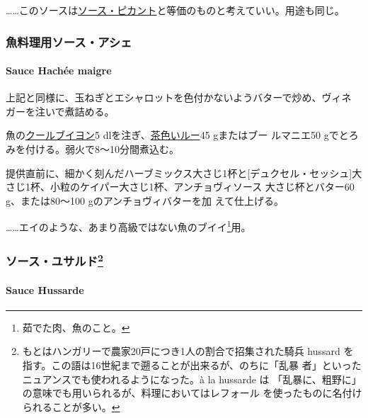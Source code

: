 \begin{recette}
\ldots{}\ldots{}このソースは\protect\hyperlink{ux30bdux30fcux30b9ux30d4ux30abux30f3ux30c8}{ソース・ピカント}と等価のものと考えていい。用途も同じ。

\maeaki

\hypertarget{ux9b5aux6599ux7406ux7528ux30bdux30fcux30b9ux30a2ux30b7ux30a7}{%
\subsubsection{魚料理用ソース・アシェ}\label{ux9b5aux6599ux7406ux7528ux30bdux30fcux30b9ux30a2ux30b7ux30a7}}

\hypertarget{sauce-hachee-maigre}{%
\paragraph{Sauce Hachée maigre}\label{sauce-hachee-maigre}}

上記と同様に、玉ねぎとエシャロットを色付かないようバターで炒め、ヴィネ
ガーを注いで煮詰める。

魚の\protect\hyperlink{}{クールブイヨン}5
dlを注ぎ、\protect\hyperlink{roux-brun}{茶色いルー}45 gまたはブー
ルマニエ50 gでとろみを付ける。弱火で8〜10分間煮込む。

提供直前に、細かく刻んだハーブミックス大さじ1杯と{[}デュクセル・セッシュ{]}大
さじ1\undemi{}杯、小粒のケイパー大さじ1\undemi{}杯、アンチョヴィソース
大さじ\undemi{}杯とバター60 g、または80〜100 gのアンチョヴィバターを加
えて仕上げる。

\ldots{}\ldots{}エイのような、あまり高級ではない魚のブイイ\footnote{茹でた肉、魚のこと。}用。

\maeaki

\hypertarget{ux30bdux30fcux30b9ux30e6ux30b5ux30ebux30c951}{%
\subsubsection[ソース・ユサルド]{\texorpdfstring{ソース・ユサルド\footnote{もとはハンガリーで農家20戸につき1人の割合で招集された騎兵
  hussard を指す。この語は16世紀まで遡ることが出来るが、のちに「乱暴
  者」といったニュアンスでも使われるようになった。à la hussarde は
  「乱暴に、粗野に」の意味でも用いられるが、料理においてはレフォール
  を使ったものに名付けられることが多い。}}{ソース・ユサルド}}\label{ux30bdux30fcux30b9ux30e6ux30b5ux30ebux30c951}}

\hypertarget{sauce-hussarde}{%
\paragraph{Sauce Hussarde}\label{sauce-hussarde}}


\end{recette}
